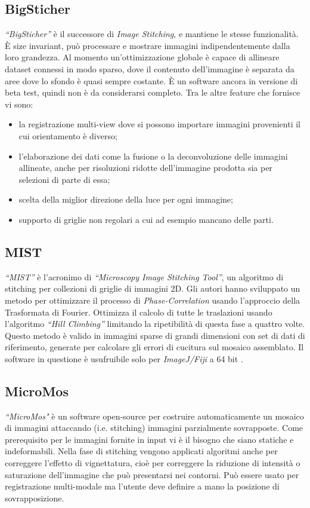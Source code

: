 \subsection{BigSticher}
\textit{``BigSticher''} è il successore di \textit{Image Stitching}, e mantiene le stesse funzionalità. È size invariant, può processare e mostrare immagini indipendentemente dalla loro grandezza. Al momento un'ottimizzazione globale è capace di allineare dataset connessi in modo sparso, dove il contenuto dell'immagine è separata da aree dove lo sfondo è quasi sempre costante. È un software ancora in versione di beta test, quindi non è da considerarsi completo. Tra le altre feature che fornisce vi sono:
\begin{itemize}
    \item la registrazione multi-view dove si possono importare immagini provenienti il cui orientamento è diverso;
    \item l'elaborazione dei dati come la fusione o la deconvoluzione delle immagini allineate, anche per risoluzioni ridotte dell'immagine prodotta sia per selezioni di parte di essa;
    \item scelta della miglior direzione della luce per ogni immagine;
    \item supporto di griglie non regolari a cui ad esempio mancano delle parti.
\end{itemize}

\subsection{MIST}
\textit{``MIST''} è l'acronimo di \textit{``Microscopy Image Stitching Tool''}, un algoritmo di stitching per collezioni di griglie di immagini 2D. Gli autori hanno sviluppato un metodo per ottimizzare il processo di \textit{Phase-Correlation} usando l'approccio della Trasformata di Fourier. Ottimizza il calcolo di tutte le traslazioni usando l'algoritmo \textit{``Hill Climbing''} limitando la ripetibilità di questa fase a quattro volte. Questo metodo è valido in immagini sparse di grandi dimensioni con set di dati di riferimento, generate per calcolare gli errori di cucitura sul mosaico assemblato. Il software in questione è usufruibile solo per \textit{ImageJ/Fiji} a 64 bit \cite{MIST}.

\subsection{MicroMos}
\textit{``MicroMos"} è un software open-source per costruire automaticamente un mosaico di immagini attaccando (i.e. stitching) immagini parzialmente sovrapposte. Come prerequisito per le immagini fornite in input vi è il bisogno che siano statiche e indeformabili. Nella fase di stitching  vengono applicati algoritmi anche per correggere l'effetto di vignettatura, cioè per correggere la riduzione di intensità o saturazione dell'immagine che può presentarsi nei contorni. Può essere usato per registrazione multi-modale ma l’utente deve definire a mano la posizione di sovrapposizione.

